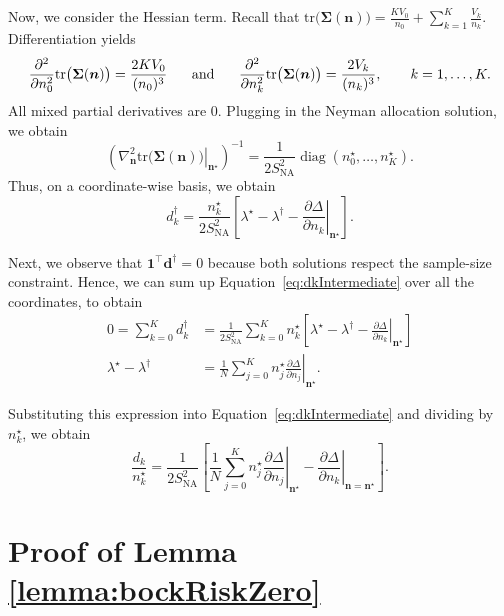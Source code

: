 \documentclass{article}
\newcommand{\bsSig}{\boldsymbol  \Sigma}
\newcommand{\bsn}{\boldsymbol n}
\newcommand{\bsns}{\boldsymbol{n^\star}}
\newcommand{\bsdd}{\boldsymbol{d^\dag}}
\newcommand{\Tr}{\text{tr}}
\newcommand{\sna}{S_{\text{NA}}}
\begin{document}
Now, we consider the Hessian term. Recall that $\Tr\big(\bsSig(\bsn)\big) = \frac{KV_0}{n_0}+\sum_{k=1}^K\frac{V_k}{n_k}$. Differentiation yields
\[  \frac{\partial^2}{\partial n_0^2} \Tr\big(\bsSig(\bsn)\big) = \frac{2KV_0}{(n_0)^3} \hspace{5mm} \text{ and } \hspace{5mm} \frac{\partial^2}{\partial n_k^2} \Tr\big(\bsSig(\bsn)\big) = \frac{2V_k}{(n_k)^3}, \qquad k=1,\dots,K.\]
All mixed partial derivatives are  $0$. Plugging in the Neyman allocation solution, we obtain 
\[ \left( \left. \nabla_{\bsn}^2 \Tr\big(\bsSig(\bsn)\big) \right|_{\bsns} \right)^{-1} = \frac{1}{2\sna^2} \operatorname{diag}(n_0^\star,\dots,n_K^\star).\]
Thus, on a coordinate-wise basis, we obtain 
\begin{equation}\label{eq:dkIntermediate}
d_k^\dag = \frac{n_k^\star}{2\sna^2} \left[ \lambda^\star-\lambda^\dag - \left. \frac{\partial\Delta}{\partial n_k} \right|_{\bsns} \right].
\end{equation}

Next, we observe that $\boldsymbol 1^\top \bsdd = 0$ because both solutions respect the sample-size constraint. Hence, we can sum up Equation~\eqref{eq:dkIntermediate} over all the coordinates, to obtain 
\begin{align*}
0 = \sum_{k=0}^K d_k^\dag &= \frac{1}{2S_{\mathrm{NA}}^2} \sum_{k=0}^K n_k^\star \left[ \lambda^\star-\lambda^\dag - \left. \frac{\partial\Delta}{\partial n_k} \right|_{\bsns} \right] \\
\lambda^\star-\lambda^\dag &= \frac{1}{N} \sum_{j=0}^K n_j^\star \left. \frac{\partial\Delta}{\partial n_j} \right|_{\bsns}.
\end{align*}

Substituting this expression into Equation~\eqref{eq:dkIntermediate} and dividing by $n_k^\star$, we obtain 
\[ \frac{d_k}{n_k^\star} = \frac{1}{2 \sna^2} \left[ \frac{1}{N} \sum_{j=0}^K n_j^\star \left. \frac{\partial\Delta}{\partial n_j} \right|_{\bsns} - \left. \frac{\partial\Delta}{\partial n_k} \right|_{\bsn=\bsns} \right]. \]

\section{Proof of Lemma \ref{lemma:bockRiskZero}}\label{sec:proofBockRisk}
\end{document}
